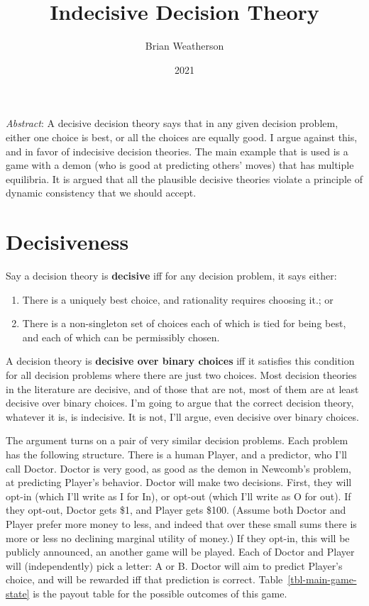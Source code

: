 \documentclass[
  11pt,
  letterpaper,
  DIV=11,
  numbers=noendperiod,
  twoside]{scrartcl}
\title{Indecisive Decision Theory}
\author{Brian Weatherson}
\date{2021}
\providecommand{\tightlist}{%
  \setlength{\itemsep}{0pt}\setlength{\parskip}{0pt}}
\renewenvironment{abstract}
 {\vspace{-1.25cm}
 \quotation\small\noindent\emph{Abstract}:}
 {\endquotation}
\begin{document}
\maketitle
\begin{abstract}
A decisive decision theory says that in any given decision problem,
either one choice is best, or all the choices are equally good. I argue
against this, and in favor of indecisive decision theories. The main
example that is used is a game with a demon (who is good at predicting
others' moves) that has multiple equilibria. It is argued that all the
plausible decisive theories violate a principle of dynamic consistency
that we should accept.
\end{abstract}


\section{Decisiveness}\label{decisiveness}

Say a decision theory is \textbf{decisive} iff for any decision problem,
it says either:

\begin{enumerate}
\def\labelenumi{\arabic{enumi}.}
\tightlist
\item
  There is a uniquely best choice, and rationality requires choosing
  it.; or
\item
  There is a non-singleton set of choices each of which is tied for
  being best, and each of which can be permissibly chosen.
\end{enumerate}

A decision theory is \textbf{decisive over binary choices} iff it
satisfies this condition for all decision problems where there are just
two choices. Most decision theories in the literature are decisive, and
of those that are not, most of them are at least decisive over binary
choices. I'm going to argue that the correct decision theory, whatever
it is, is indecisive. It is not, I'll argue, even decisive over binary
choices.

The argument turns on a pair of very similar decision problems. Each
problem has the following structure. There is a human Player, and a
predictor, who I'll call Doctor. Doctor is very good, as good as the
demon in Newcomb's problem, at predicting Player's behavior. Doctor will
make two decisions. First, they will opt-in (which I'll write as I for
In), or opt-out (which I'll write as O for out). If they opt-out, Doctor
gets \$1, and Player gets \$100. (Assume both Doctor and Player prefer
more money to less, and indeed that over these small sums there is more
or less no declining marginal utility of money.) If they opt-in, this
will be publicly announced, an another game will be played. Each of
Doctor and Player will (independently) pick a letter: A or B. Doctor
will aim to predict Player's choice, and will be rewarded iff that
prediction is correct. Table~\ref{tbl-main-game-state} is the payout
table for the possible outcomes of this game.
\end{document}
